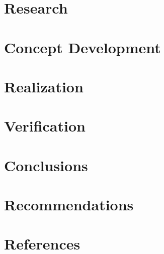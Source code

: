 \documentclass[11pt, a4paper]{report}
\begin{document}
\begin{justify}
    \chapter{Research}
    

    \chapter{Concept Development}
    

    \chapter{Realization}
    

    \chapter{Verification}
    

    \chapter{Conclusions}
    

    \chapter{Recommendations}
    

    \chapter*{References}

    
    
    \end{justify}
\end{document}
